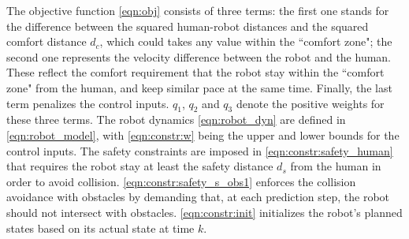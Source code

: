 \documentclass[journal]{IEEEtran}
\begin{document}
	The objective function \cref{eqn:obj} consists of three terms: the first one stands for the difference between the squared human-robot distances and the squared comfort distance $d_c$, which could takes any value within the ``comfort zone"; the second one represents the velocity difference between the robot and the human.
	These reflect the comfort requirement that the robot stay within the ``comfort zone" from the human, and keep similar pace at the same time. 
Finally, the last term penalizes the control inputs.
	$q_1$, $q_2$ and $q_3$ denote the positive weights for these three terms.
	The robot dynamics \cref{eqn:robot_dyn} are defined in \cref{eqn:robot_model}, with \cref{eqn:constr:w} being the upper and lower bounds for the control inputs.
    The safety constraints are imposed in \cref{eqn:constr:safety_human} that requires the robot stay at least the safety distance $d_s$ from the human in order to avoid collision.
	\cref{eqn:constr:safety_s_obs1} enforces the collision avoidance with obstacles by demanding that, at each prediction step, the robot should not intersect with obstacles.
    \cref{eqn:constr:init} initializes the robot's planned states based on its actual state at time $k$.
	
\end{document}
